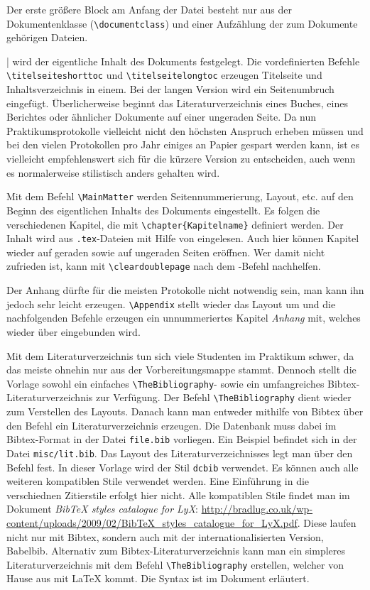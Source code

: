 Der erste größere Block am Anfang der Datei besteht nur aus der Dokumentenklasse (\verb|\documentclass|) und einer Aufzählung der zum Dokumente gehörigen Dateien.
\begin{document}
| wird der eigentliche Inhalt des Dokuments festgelegt. Die vordefinierten Befehle \verb|\titelseiteshorttoc| und \verb|\titelseitelongtoc| erzeugen Titelseite und Inhaltsverzeichnis in einem. Bei der langen Version wird ein Seitenumbruch eingefügt. Überlicherweise beginnt das Literaturverzeichnis eines Buches, eines Berichtes oder ähnlicher Dokumente auf einer ungeraden Seite. Da nun Praktikumsprotokolle vielleicht nicht den höchsten Anspruch erheben müssen und bei den vielen Protokollen pro Jahr einiges an Papier gespart werden kann, ist es vielleicht empfehlenswert sich für die kürzere Version zu entscheiden, auch wenn es normalerweise stilistisch anders gehalten wird.

Mit dem Befehl \verb|\MainMatter| werden Seitennummerierung, Layout, etc. auf den Beginn des eigentlichen Inhalts des Dokuments eingestellt. Es folgen die verschiedenen Kapitel, die mit \verb|\chapter{Kapitelname}| definiert werden. Der Inhalt wird aus \verb|.tex|-Dateien mit Hilfe von \verb|| eingelesen. Auch hier können Kapitel wieder auf geraden sowie auf ungeraden Seiten eröffnen. Wer damit nicht zufrieden ist, kann mit \verb|\cleardoublepage| nach dem \verb||-Befehl nachhelfen.

Der Anhang dürfte für die meisten Protokolle nicht notwendig sein, man kann ihn jedoch sehr leicht erzeugen. \verb|\Appendix| stellt wieder das Layout um und die nachfolgenden Befehle erzeugen ein unnummeriertes Kapitel \textit{Anhang} mit, welches wieder über \verb|| eingebunden wird.

Mit dem Literaturverzeichnis tun sich viele Studenten im Praktikum schwer, da das meiste ohnehin nur aus der Vorbereitungsmappe stammt. Dennoch stellt die Vorlage sowohl ein einfaches \verb|\TheBibliography|- sowie ein umfangreiches Bibtex-Literaturverzeichnis zur Verfügung. Der Befehl \verb|\TheBibliography| dient wieder zum Verstellen des Layouts. Danach kann man entweder mithilfe von Bibtex über den Befehl \verb|| ein Literaturverzeichnis erzeugen. Die Datenbank muss dabei im Bibtex-Format in der Datei \verb|file.bib| vorliegen. Ein Beispiel befindet sich in der Datei \verb|misc/lit.bib|. Das Layout des Literaturverzeichnisses legt man über den Befehl \verb|| fest. In dieser Vorlage wird der Stil \verb|dcbib| verwendet. Es können auch alle weiteren kompatiblen Stile verwendet werden. Eine Einführung in die verschiednen Zitierstile erfolgt  hier nicht. Alle kompatiblen Stile findet man im Dokument \textit{BibTeX styles catalogue for LyX}: \url{http://bradlug.co.uk/wp-content/uploads/2009/02/BibTeX_styles_catalogue_for_LyX.pdf}. Diese laufen nicht nur mit Bibtex, sondern auch mit der internationalisierten Version, Babelbib. Alternativ zum Bibtex-Literaturverzeichnis kann man ein simpleres Literaturverzeichnis mit dem Befehl \verb|\TheBibliography| erstellen, welcher von Hause aus mit LaTeX kommt. Die Syntax ist im Dokument erläutert.
\end{document}
